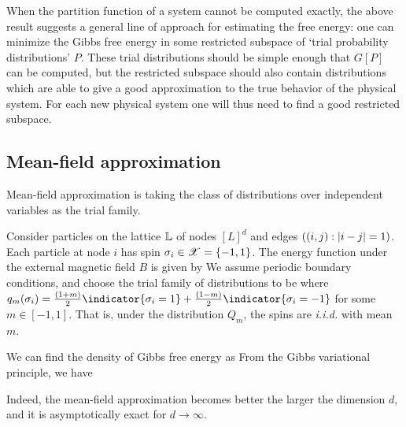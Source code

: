 \documentclass[letterpaper,english,10pt]{article}
\begin{document}
When the partition function of a system cannot be computed exactly, the above result suggests a general line of approach for estimating the free energy: one can minimize the Gibbs free energy in some restricted subspace of `trial probability distributions' $P$.  
These trial distributions should be simple enough that $G[P]$ can be computed, 
but the restricted subspace should also contain distributions which are able to give a good approximation to the true behavior of the physical system. 
For each new physical system one will thus need to find a good restricted subspace. 

\subsection{Mean-field approximation}
Mean-field approximation is taking the class of distributions over independent variables as the trial family. 
\begin{shaded*}
\begin{exmp} 
Consider particles on the lattice $\mathbb{L}$ of nodes $[L]^d$ and edges $((i,j): \left\lvert i-j\right\rvert=1)$. 
Each particle at node $i$ has spin $\sigma_i \in \mathscr{X} = \left\{-1,1\right\}$. 
The energy function under the external magnetic field $B$ is given by 
We assume periodic boundary conditions, and choose the trial family of distributions to be 
where $q_m(\sigma_i) = \frac{(1+m)}{2}\indicator{\sigma_i=1}+ \frac{(1-m)}{2}\indicator{\sigma_i=-1}$ for some $m \in [-1,1]$. 
That is, under the distribution $Q_m$, the spins are \emph{i.i.d.} with mean $m$. 

We can find the density of Gibbs free energy as 
From the Gibbs variational principle, we have 
\end{exmp}
\end{shaded*}
Indeed, the mean-field approximation becomes better the larger the dimension $d$, and it is asymptotically exact for $d \to \infty$.
\end{document}
